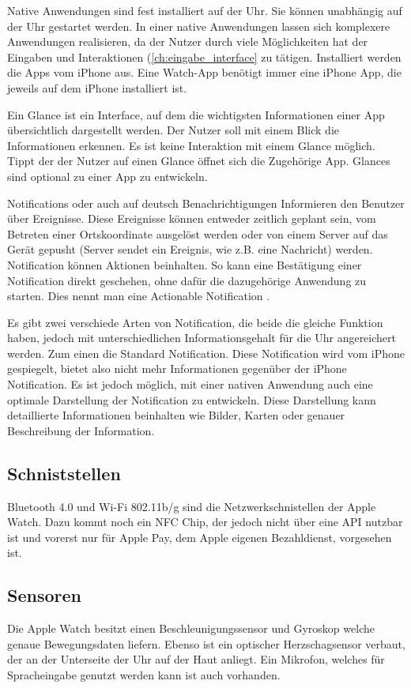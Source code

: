 Native Anwendungen sind fest installiert auf der Uhr. Sie können unabhängig auf der Uhr gestartet werden. In einer native Anwendungen lassen sich komplexere Anwendungen realisieren, da der Nutzer durch viele Möglichkeiten hat der Eingaben und Interaktionen (\ref{ch:eingabe_interface} zu tätigen. Installiert werden die Apps vom iPhone aus. Eine Watch-App benötigt immer eine iPhone App, die jeweils auf dem iPhone installiert ist.

Ein Glance ist ein Interface, auf dem die wichtigsten Informationen einer App übersichtlich dargestellt werden. Der Nutzer soll mit einem Blick die Informationen erkennen. Es ist keine Interaktion mit einem Glance möglich. Tippt der der Nutzer auf einen Glance öffnet sich die Zugehörige App. Glances sind optional zu einer App zu entwickeln.

Notifications oder auch auf deutsch Benachrichtigungen Informieren den Benutzer über Ereignisse. Diese Ereignisse können entweder zeitlich geplant sein, vom Betreten einer Ortskoordinate ausgelöst werden oder von einem Server auf das Gerät gepusht (Server sendet ein Ereignis, wie z.B. eine Nachricht) werden. Notification können Aktionen beinhalten. So kann eine Bestätigung einer Notification direkt geschehen, ohne dafür die dazugehörige Anwendung zu starten. Dies nennt man eine Actionable Notification \cite{Apple:2015devAw}.

Es gibt zwei verschiede Arten von Notification, die beide die gleiche Funktion haben, jedoch mit unterschiedlichen Informationsgehalt für die Uhr angereichert werden. Zum einen die Standard Notification. Diese Notification wird vom iPhone gespiegelt, bietet also nicht mehr Informationen gegenüber der iPhone Notification. Es ist jedoch möglich, mit einer nativen Anwendung auch eine optimale Darstellung der Notification zu entwickeln. Diese Darstellung kann detaillierte Informationen beinhalten wie Bilder, Karten oder genauer Beschreibung der Information\cite{Apple:2015notif}.

\subsection{Schniststellen}
Bluetooth 4.0 und Wi-Fi 802.11b/g sind die Netzwerkschnistellen der Apple Watch. Dazu kommt noch ein NFC Chip, der jedoch nicht über eine API nutzbar ist und vorerst nur für Apple Pay, dem Apple eigenen Bezahldienst, vorgesehen ist\cite{RITCHIE:2015aa}. 
\subsection{Sensoren}
Die Apple Watch besitzt einen Beschleunigungssensor und Gyroskop welche genaue Bewegungsdaten liefern. Ebenso ist ein optischer Herzschagsensor verbaut, der an der Unterseite der Uhr auf der Haut anliegt. Ein Mikrofon, welches für Spracheingabe genutzt werden kann ist auch vorhanden.
